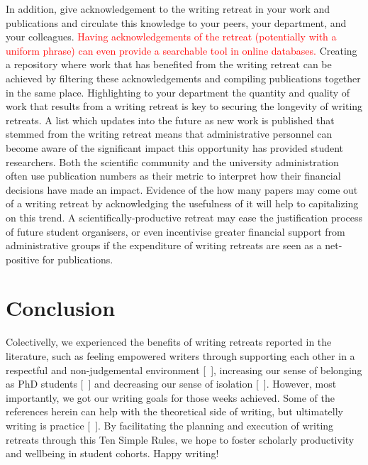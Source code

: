 \documentclass[10pt,letterpaper]{article}
\begin{document}

In addition, give acknowledgement to the writing retreat in your work and publications and circulate this knowledge to your peers, your department, and your colleagues. \textcolor{red}{Having acknowledgements of the retreat (potentially with a uniform phrase) can even provide a searchable tool in online databases.} Creating a repository where work that has benefited from the writing retreat can be achieved by filtering these acknowledgements and compiling publications together in the same place. Highlighting to your department the quantity and quality of work that results from a writing retreat is key to securing the longevity of writing retreats. A list which updates into the future as new work is published that stemmed from the writing retreat means that administrative personnel can become aware of the significant impact this opportunity has provided student researchers. Both the scientific community and the university administration often use publication numbers as their metric to interpret how their financial decisions have made an impact. Evidence of the how many papers may come out of a writing retreat by acknowledging the usefulness of it will help to capitalizing on this trend. A scientifically-productive retreat may ease the justification process of future student organisers, or even incentivise greater financial support from administrative groups if the expenditure of writing retreats are seen as a net-positive for publications.

\section*{Conclusion}

Colectivelly, we experienced the benefits of writing retreats reported in the literature, such as feeling empowered writers through supporting each other in a respectful and non-judgemental environment [~\cite{papen2018}], increasing our sense of belonging as PhD students [~\cite{omeara}] and decreasing our sense of isolation [~\cite{eardley2021}]. However, most importantly, we got our writing goals for those weeks achieved. Some of the references herein can help with the theoretical side of writing, but ultimatelly writing is practice [~\cite{peterson2018, grogan2021}]. By facilitating the planning and execution of writing retreats through this Ten Simple Rules, we hope to foster scholarly productivity and wellbeing in student cohorts. Happy writing!
\end{document}
